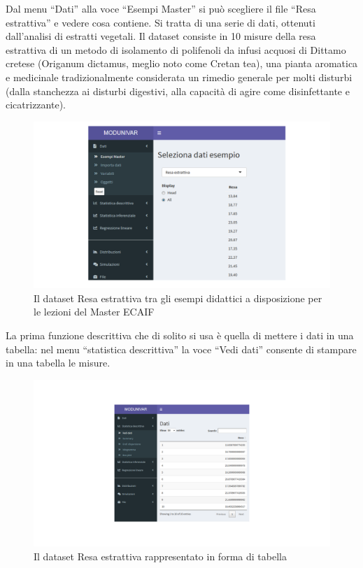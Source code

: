 \documentclass[
  11pt,
]{book}
\begin{document}
Dal menu ``Dati'' alla voce ``Esempi Master'' si può scegliere il file ``Resa estrattiva'' e vedere cosa contiene. Si tratta di una serie di dati, ottenuti dall'analisi di estratti vegetali. Il dataset consiste in 10 misure della resa estrattiva di un metodo di isolamento di polifenoli da infusi acquosi di Dittamo cretese (Origanum dictamus, meglio noto come Cretan tea), una pianta aromatica e medicinale tradizionalmente considerata un rimedio generale per molti disturbi (dalla stanchezza ai disturbi digestivi, alla capacità di agire come disinfettante e cicatrizzante).

\begin{figure}

{\centering \includegraphics[width=1\linewidth]{Immagini/Descrittiva/1_Resa_estrattiva} 

}

\caption{Il dataset Resa estrattiva tra gli esempi didattici a disposizione per le lezioni del Master ECAIF}\label{fig:sd1}
\end{figure}

La prima funzione descrittiva che di solito si usa è quella di mettere i dati in una tabella: nel menu ``statistica descrittiva'' la voce ``Vedi dati'' consente di stampare in una tabella le misure.

\begin{figure}

{\centering \includegraphics[width=1\linewidth]{Immagini/Descrittiva/2_TabelladatiResa estrattiva} 

}

\caption{Il dataset Resa estrattiva rappresentato in forma di tabella}\label{fig:sd2}
\end{figure}
\end{document}
